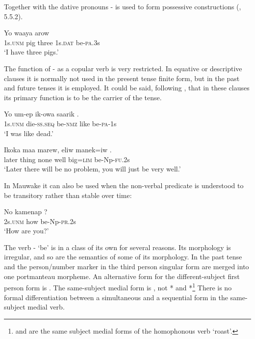 Together with the dative pronouns - is used to form possessive constructions  (, 5.5.2). 

\ea%
\label{ex:3:x258}
\gll Yo waaya arow   \\
1s.\textsc{unm} pig three 1s.\textsc{dat} be-\textsc{pa}.3s \\
\glt`I have three pigs.'
\z

The function of - as a copular verb is very restricted. In equative or descriptive clauses it is normally not used in the present tense finite form, but in the past  and future  tenses it is employed. It could be said, following \citet[92]{Givon1984}, that in these clauses its primary function is to be the carrier of the tense. 

\ea%
\label{ex:3:x259}
\gll Yo um-ep ik-owa saarik . \\
1s.\textsc{unm} die-\textsc{ss}.\textsc{seq} be-\textsc{nmz} like be-\textsc{pa}-1s\\
\glt`I was like dead.'
\z

\ea%
\label{ex:3:x1070}
\gll Ikoka maa marew, eliw manek=iw . \\
later thing none well big=\textsc{lim} be-Np-\textsc{fu}.2s\\
\glt`Later there will be no problem, you will just be very well.'
\z

In Mauwake it can also be used when the non-verbal predicate is understood to be transitory  rather than stable over time:

\ea%
\label{ex:3:x499}
\gll No kamenap ? \\
2s.\textsc{unm} how be-Np-\textsc{pr}.2s\\
\glt`How are you?' 
\z

The verb - `be' is in a class of its own for several reasons. Its morphology is irregular, and so are the semantics of some of its morphology. In  the past tense and the person/number marker in the third person singular form are merged into one portmanteau morpheme. An alternative form for the different-subject first person form  is  . The same-subject medial form is  , not * and *\footnote{ and  are the same subject medial forms of the homophonous verb  `roast'.} There is no formal differentiation between a simultaneous  and a sequential  form in the same-subject medial verb. 

